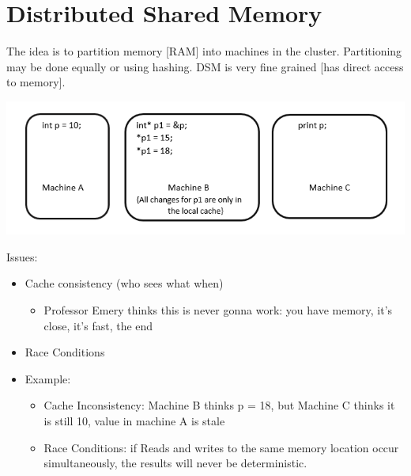 \documentclass[twoside]{article}
\begin{document}
\section{Distributed Shared Memory }

The idea is to partition memory [RAM] into machines in the cluster. Partitioning may be done equally or using hashing. DSM is very fine grained [has direct access to memory].
\par
\includegraphics[scale=1]{fig-1.PNG}
\par
Issues:

\begin{itemize}
\item Cache consistency (who sees what when)
\begin{itemize}
\item	Professor Emery thinks this is never gonna work: you have memory, it’s close, it’s fast, the end
\end{itemize}
\item	Race Conditions
\item	Example: 

\begin{itemize}
\item	Cache Inconsistency: Machine B thinks p = 18, but Machine C thinks it is still 10, value in machine A is stale
\item	Race Conditions: if Reads and writes to the same memory location occur simultaneously, the results will never be deterministic.  
\end{itemize}
\end{itemize}
\end{document}
